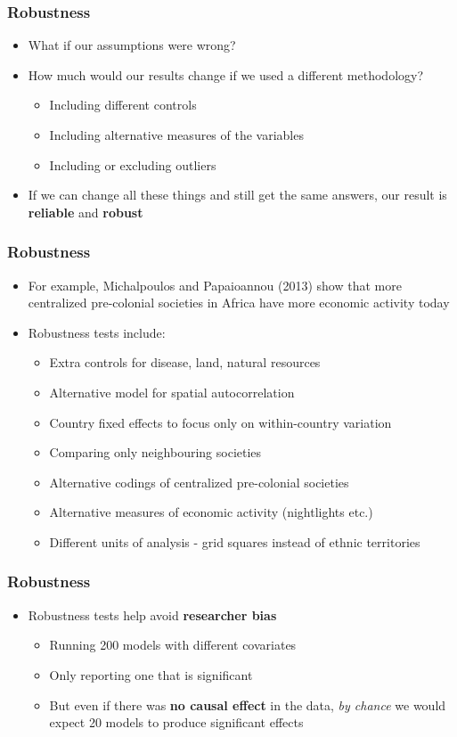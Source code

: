\documentclass[xcolor=x11names,compress]{beamer}\usepackage[]{graphicx}\usepackage[]{color}
\renewcommand{\(}{\begin{columns}}
\renewcommand{\)}{\end{columns}}
\newcommand{\<}[1]{\begin{column}{#1}}
\renewcommand{\>}{\end{column}}
\begin{document}
\begin{frame}
\frametitle{Robustness}
\begin{itemize}
\item What if our assumptions were wrong?
\item How much would our results change if we used a different methodology?
\begin{itemize}
\item Including different controls
\item Including alternative measures of the variables
\item Including or excluding outliers
\end{itemize}
\item If we can change all these things and still get the same answers, our result is \textbf{reliable} and \textbf{robust}
\end{itemize}
\end{frame}

\begin{frame}
\frametitle{Robustness}
\begin{itemize}
\item For example, Michalpoulos and Papaioannou (2013) show that more centralized pre-colonial societies in Africa have more economic activity today
\item Robustness tests include:
\begin{itemize}
\item Extra controls for disease, land, natural resources
\item Alternative model for spatial autocorrelation
\item Country fixed effects to focus only on within-country variation
\item Comparing only neighbouring societies
\item Alternative codings of centralized pre-colonial societies
\item Alternative measures of economic activity (nightlights etc.)
\item Different units of analysis - grid squares instead of ethnic territories
\end{itemize}
\end{itemize}
\end{frame}

\begin{frame}
\frametitle{Robustness}
\begin{itemize}
\item Robustness tests help avoid \textbf{researcher bias}
\begin{itemize}
\item Running 200 models with different covariates
\item Only reporting one that is significant
\item But even if there was \textbf{no causal effect} in the data, \textit{by chance} we would expect 20 models to produce significant effects
\end{itemize}
\end{itemize}
\end{frame}
\end{document}
